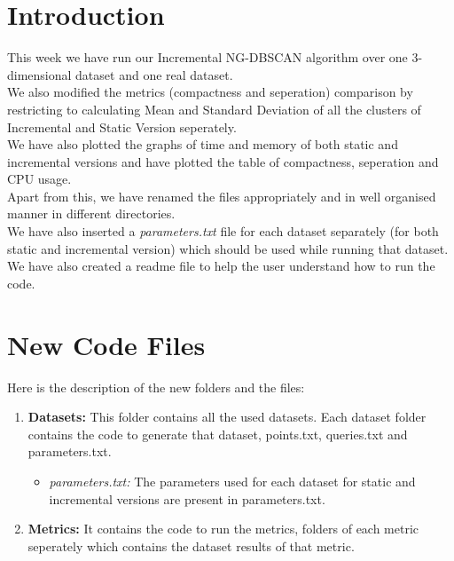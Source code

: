 \documentclass[acmsmall]{acmart}
\begin{document}
\section*{Introduction}
This week we have run our Incremental NG-DBSCAN algorithm over one 3-dimensional dataset and one real dataset. \\ We also modified the metrics (compactness and seperation) comparison by restricting to calculating Mean and Standard Deviation of all the clusters of Incremental and Static Version seperately. \\ We have also plotted the graphs of time and memory of both static and incremental versions and have plotted the table of compactness, seperation and CPU usage. \\ Apart from this, we have renamed the files appropriately and in well organised manner in different directories. \\ We have also inserted a \textit{parameters.txt} file for each dataset separately (for both static and incremental version) which should be used while running that dataset. \\ We have also created a readme file to help the user understand how to run the code. 
\section*{New Code Files}
Here is the description of the new folders and the files:
\begin{enumerate}
    \item \textbf{Datasets: }This folder contains all the used datasets. Each dataset folder contains the code to generate that dataset, points.txt, queries.txt and parameters.txt.
    \begin{itemize}
        \item \textit{parameters.txt: }The parameters used for each dataset for static and incremental versions are present in parameters.txt.
    \end{itemize}
    \item \textbf{Metrics: }It contains the code to run the metrics, folders of each metric seperately which contains the dataset results of that metric.
\end{enumerate}
\end{document}
